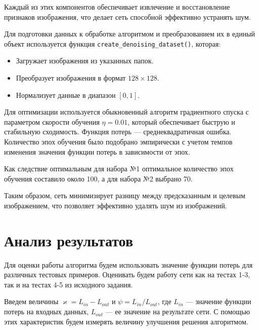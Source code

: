 \documentclass[12pt, a4paper]{article}
\renewcommand{\kappa}{\varkappa}
\begin{document}
Каждый из этих компонентов обеспечивает извлечение и восстановление признаков изображения, что делает сеть способной эффективно устранять шум.

Для подготовки данных к обработке алгоритмом и преобразованием их в единый объект используется  функция \texttt{create\_denoising\_dataset()}, которая:
\begin{itemize}
	\item Загружает изображения из указанных папок.
	\item Преобразует изображения в формат $128 \times 128$.
	\item Нормализует данные в диапазон $[0, 1]$.
\end{itemize}

\newpage
 Для оптимизации используется обыкновенный алгоритм градиентного спуска с параметром скорости обучения $ \eta = 0.01$, который обеспечивает быструю и стабильную сходимость. Функция потерь — среднеквадратичная ошибка. Количество эпох обучения было подобрано эмпирически с учетом темпов изменения значения функции потерь в зависимости от эпох.
 
  Как следствие оптимальным для набора №1 оптимальное количество эпох обучения составило около 100, а для набора №2 выбрано 70.

Таким образом, сеть минимизирует разницу между предсказанным и целевым изображением, что позволяет эффективно удалять шум из изображений.

\newpage
\vspace{-0.5em}
\section{Анализ результатов}
\vspace{-0.5em}
Для оценки работы алгоритма будем использовать значение функции потерь для различных тестовых примеров. Оценивать будем работу сети как на тестах 1-3, так и на тестах 4-5 из исходного задания. 

Введем величины $\kappa = L_{in} - L_{out}$ и  $\psi =  L_{in} / L_{out}$, где $L_{in}$ --- значение функции потерь на входных данных, $L_{out}$ --- ее значение на результате сети. С помощью этих характеристик будем измерять величину улучшения решения алгоритмом. 
\vspace{-0.5em}
\end{document}
